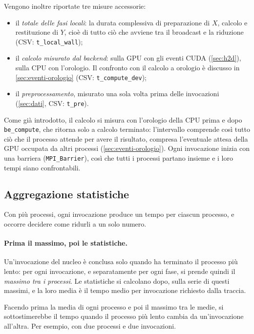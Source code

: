 \documentclass[11pt,a4paper]{article}
\begin{document}
Vengono inoltre riportate tre misure accessorie:
\begin{itemize}
  \item il \emph{totale delle fasi locali}: la durata complessiva di
        preparazione di $X$, calcolo e restituzione di $Y$, cioè di tutto ciò
        che avviene tra il broadcast e la riduzione (CSV:
        \texttt{t\_local\_wall});
  \item il \emph{calcolo misurato dal backend}: sulla GPU con gli eventi CUDA
        (\cref{sec:h2d}), sulla CPU con l'orologio. Il confronto con il calcolo
        a orologio è discusso in \cref{sec:eventi-orologio} (CSV:
        \texttt{t\_compute\_dev});
  \item il \emph{preprocessamento}, misurato una sola volta prima delle
        invocazioni (\cref{sec:dati}, CSV: \texttt{t\_pre}).
\end{itemize}

Come già introdotto, il calcolo si misura con l'orologio della CPU prima e dopo
\texttt{be\_compute}, che ritorna solo a calcolo terminato: l'intervallo
comprende così tutto ciò che il processo attende per avere il risultato,
compresa l'eventuale attesa della GPU occupata da altri processi
(\cref{sec:eventi-orologio}). Ogni invocazione inizia con una barriera
(\texttt{MPI\_Barrier}), così che tutti i processi partano insieme e i loro
tempi siano confrontabili.

\subsection{Aggregazione statistiche}\label{sec:statistiche}

Con più processi, ogni invocazione produce un tempo per ciascun processo, e
occorre decidere come ridurli a un solo numero.

\paragraph{Prima il massimo, poi le statistiche.} Un'invocazione del nucleo è
conclusa solo quando ha terminato il processo più lento: per ogni invocazione,
e separatamente per ogni fase, si prende quindi il \emph{massimo tra i
processi}. Le statistiche si calcolano dopo, sulla serie di questi massimi, e
la loro media è il tempo medio per invocazione richiesto dalla traccia.

Facendo prima la media di ogni processo e poi il massimo tra le
medie, si sottostimerebbe il tempo quando il processo più lento cambia da
un'invocazione all'altra. Per esempio, con due processi e due invocazioni.
\end{document}
